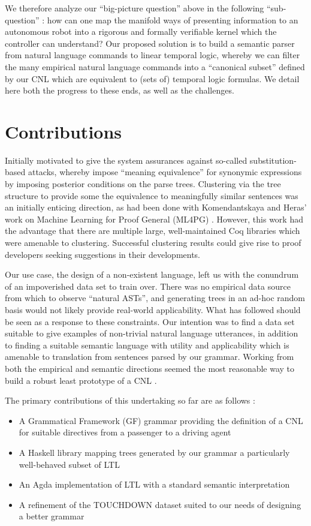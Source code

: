 \documentclass[a4paper, 11pt]{article}
\begin{document}
We therefore analyze our ``big-picture question'' above in the following
``sub-question'' : how can one map the manifold ways of presenting information
to an autonomous robot into a rigorous and formally verifiable kernel which the
controller can understand? Our proposed solution is to build a semantic parser
from natural language commands to linear temporal logic, whereby we can filter
the many empirical natural language commands into a ``canonical subset'' defined
by our CNL which are equivalent to (sets of) temporal logic formulas. We detail
here both the progress to these ends, as well as the challenges.

\section{Contributions}

Initially
motivated to give the system assurances against so-called
substitution-based attacks, whereby impose ``meaning equivalence'' for synonymic
expressions by imposing posterior conditions on the parse trees. Clustering via
the tree structure to provide some the equivalence to meaningfully similar
sentences was an initially enticing direction, as had been done with
Komendantskaya and Heras' work on Machine Learning for Proof General (ML4PG)
\cite{ml4pg}. However, this work had the advantage that there are multiple
large, well-maintained Coq libraries which were amenable to clustering.
Successful clustering results could give rise to proof developers seeking
suggestions in their developments.

Our use case, the design of a non-existent language, left us with the conundrum
of an impoverished data set to train over. There was no empirical data source
from which to observe ``natural ASTs'', and generating trees in an ad-hoc random basis would
not likely provide real-world applicability. What has followed should be seen as
a response to these constraints. Our intention was to find a data set suitable
to give examples of non-trivial natural language utterances, in addition to
finding a suitable semantic language with utility and applicability which is
amenable to translation from sentences parsed by our grammar. Working from both
the empirical and semantic directions seemed the most reasonable way to build a
robust least prototype of a CNL .

The primary contributions of this undertaking so far are as follows :

\begin{itemize}[noitemsep]
\item A Grammatical Framework (GF) grammar providing the definition of a CNL for
suitable directives from a passenger to a driving agent
\item A Haskell library mapping trees generated by our grammar a particularly well-behaved subset of LTL
\item An Agda implementation of LTL with a standard semantic interpretation
\item A refinement of the TOUCHDOWN dataset \cite{chen2019touchdown} suited to our needs of designing a
better grammar
\end{itemize}
\end{document}
